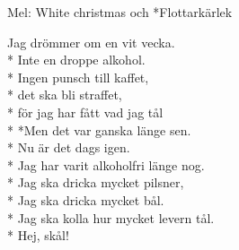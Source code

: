 \begin{SongText}
    \begin{SongInfo}
        Mel: White christmas och *Flottarkärlek
    \end{SongInfo}
    \begin{SongVerse}
        Jag drömmer om en vit vecka.\\*%
        Inte en droppe alkohol.\\*%
        Ingen punsch till kaffet,\\*%
        det ska bli straffet,\\*%
        för jag har fått vad jag tål\\*%
        *Men det var ganska länge sen.\\*%
        Nu är det dags igen.\\*%
        Jag har varit alkoholfri länge nog.\\*%
        Jag ska dricka mycket pilsner,\\*%
        Jag ska dricka mycket bål.\\*%
        Jag ska kolla hur mycket levern tål.\\*%
        Hej, skål!
    \end{SongVerse}
\end{SongText}
